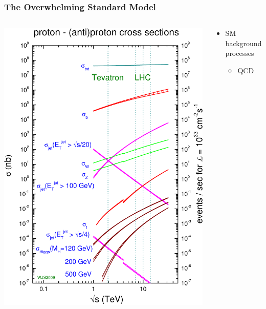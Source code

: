 \documentclass{beamer}
\begin{document}
\begin{frame}
\begin{columns}
\begin{column}{0.5\textwidth}
    \end{column}
  \end{columns}
\end{frame}

\begin{frame}
  \frametitle{The Overwhelming Standard Model}
  \begin{columns}
    \begin{column}{0.45\textwidth}
      \centering
      \includegraphics[width=\textwidth]{lhc/crosssections2009_v2.pdf}
    \end{column}
    \begin{column}{0.55\textwidth}
      \begin{itemize}
      \item<2-> SM background processes
        \begin{itemize}
        \item<2-> QCD

\end{itemize}
\end{itemize}
\end{column}
\end{columns}
\end{frame}
\end{document}
